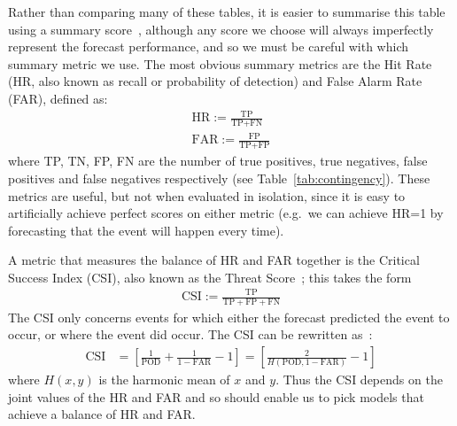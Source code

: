 \documentclass[../main.tex]{subfiles}
\begin{document}
Rather than comparing many of these tables, it is easier to summarise this table using a summary score~\citep{wilks_forecast_2019}, although any score we choose will always imperfectly represent the forecast performance, and so we must be careful with which summary metric we use. The most obvious summary metrics are the Hit Rate (HR, also known as recall or probability of detection) and False Alarm Rate (FAR), defined as:
\begin{align}
    \text{HR} := \frac{\text{TP}}{\text{TP} + \text{FN}}\\
    \text{FAR}:= \frac{\text{FP}}{\text{TP} + \text{FP}}
\end{align}
where TP, TN, FP, FN are the number of true positives, true negatives, false positives and false negatives respectively (see Table~\ref{tab:contingency}). These metrics are useful, but not when evaluated in isolation, since it is easy to artificially achieve perfect scores on either metric (e.g.~we can achieve HR=1 by forecasting that the event will happen every time).

A metric that measures the balance of HR and FAR together is the Critical Success Index (CSI), also known as the Threat Score~\citep{wilks_forecast_2019}; this takes the form
\begin{align}
\text{CSI} := \frac{\text{TP}}{\text{TP} + \text{FP} + \text{FN}}
\end{align}
 The CSI only concerns events for which either the forecast predicted the event to occur, or where the event did occur. The CSI can be rewritten as~\citep{schaefer_critical_1990}:
\begin{align}
    \text{CSI} &= \left[ \frac{1}{\text{POD}} + \frac{1}{1-\text{FAR}} - 1\right] =\left[ \frac{2}{H(\text{POD},{1-\text{FAR}})} - 1\right]
\end{align}
where $H(x,y)$ is the harmonic mean of $x$ and $y$. Thus the CSI depends on the joint values of the HR and FAR and so should enable us to pick models that achieve a balance of HR and FAR.
\end{document}
